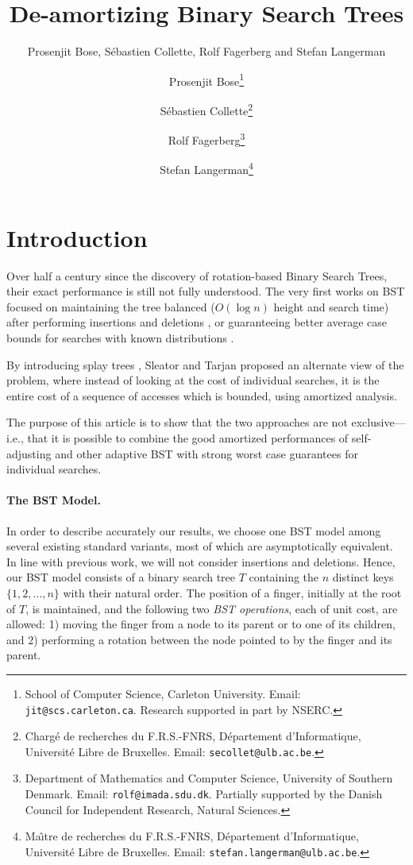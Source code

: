 \documentclass[11pt]{article}
\title{De-amortizing Binary Search Trees}
\author{Prosenjit Bose, S\'ebastien Collette, Rolf Fagerberg and
  Stefan Langerman}
\author{
Prosenjit Bose\thanks{School of Computer Science, Carleton
University. Email: \texttt{jit@scs.carleton.ca}. Research supported in
part by NSERC.}
\and
S\'ebastien Collette\thanks{Charg\'e de recherches du F.R.S.-FNRS,
  Département d'Informatique, Universit\'e Libre de Bruxelles. 
Email: \texttt{secollet@ulb.ac.be}.}
\and
Rolf Fagerberg\thanks{Department of Mathematics and Computer Science,
University of Southern Denmark. Email: \texttt{rolf@imada.sdu.dk}.
Partially supported by
the Danish Council for Independent Research, Natural Sciences.}
\and 
Stefan Langerman\thanks{Ma{\^\i}tre de recherches du F.R.S.-FNRS,
  Département d'Informatique, Universit\'e Libre de Bruxelles. 
Email: \texttt{stefan.langerman@ulb.ac.be}.}
}
\date{}
\begin{document}
\maketitle
{}

\thispagestyle{empty}

\newpage

\setcounter{page}{1}

\section{Introduction}

Over half a century since the discovery of rotation-based Binary Search
Trees, their exact performance is still not fully understood.
The very first works on BST focused on maintaining the tree balanced
($O(\log n)$ height and search time) after performing insertions and
deletions  \cite{avl,redblack}, or guaranteeing better average case bounds
for searches with known distributions \cite{optimum1}.

By introducing splay trees \cite{splay}, Sleator and Tarjan proposed an
alternate view of the problem, where instead of looking at the cost of
individual searches, it is the entire cost of a sequence of accesses
which is bounded, using amortized analysis.

The purpose of this article is to show that the two approaches are not
exclusive---i.e., that it is possible to combine the good amortized
performances of self-adjusting and other adaptive BST with strong worst
case guarantees for individual searches.

\paragraph{The BST Model.}
In order to describe accurately our results, we choose one BST model among
several existing standard variants, most of which are asymptotically
equivalent. In line with previous work, we will not consider insertions and
deletions. Hence, our BST model consists of a binary search tree $T$
containing the $n$ distinct keys $\{1,2,\ldots,n\}$ with their natural
order. The position of a finger, initially at the root of $T$, is
maintained, and the following two \emph{BST operations}, each of unit cost,
are allowed: 1) moving the finger from a node to its parent or to one of
its children, and 2) performing a rotation between the node pointed to by
the finger and its parent.
\end{document}
